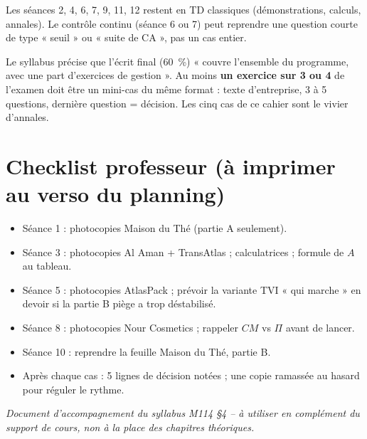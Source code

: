 \documentclass[12pt,a4paper]{article}
\begin{document}
Les séances 2, 4, 6, 7, 9, 11, 12 restent en TD classiques (démonstrations, calculs, annales). Le contrôle continu (séance 6 ou 7) peut reprendre une question courte de type « seuil » ou « suite de CA », pas un cas entier.

\begin{propbox}
Le syllabus précise que l'écrit final (60~\%) « couvre l'ensemble du programme, avec une part d'exercices de gestion ». Au moins \textbf{un exercice sur 3 ou 4} de l'examen doit être un mini-cas du même format : texte d'entreprise, 3 à 5 questions, dernière question = décision. Les cinq cas de ce cahier sont le vivier d'annales.
\end{propbox}

\section*{Checklist professeur (à imprimer au verso du planning)}
\begin{itemize}[leftmargin=1.2cm]
  \item [\,] Séance 1 : photocopies Maison du Thé (partie A seulement).
  \item [\,] Séance 3 : photocopies Al Aman + TransAtlas ; calculatrices ; formule de $A$ au tableau.
  \item [\,] Séance 5 : photocopies AtlasPack ; prévoir la variante TVI « qui marche » en devoir si la partie B piège a trop déstabilisé.
  \item [\,] Séance 8 : photocopies Nour Cosmetics ; rappeler $CM$ vs $\Pi$ avant de lancer.
  \item [\,] Séance 10 : reprendre la feuille Maison du Thé, partie B.
  \item [\,] Après chaque cas : 5 lignes de décision notées ; une copie ramassée au hasard pour réguler le rythme.
\end{itemize}

\vspace{0.5cm}
{\small\color{mundigray}\textit{Document d'accompagnement du syllabus M114 \S4 -- à utiliser en complément du support de cours, non à la place des chapitres théoriques.}}
\end{document}
